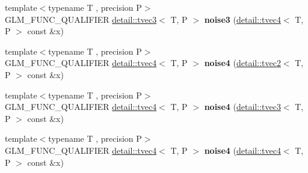 \begin{DoxyCompactItemize}
\item 
{\footnotesize template$<$typename T , precision P$>$ }\\G\+L\+M\+\_\+\+F\+U\+N\+C\+\_\+\+Q\+U\+A\+L\+I\+F\+I\+ER \hyperlink{structglm_1_1detail_1_1tvec3}{detail\+::tvec3}$<$ T, P $>$ {\bfseries noise3} (\hyperlink{structglm_1_1detail_1_1tvec4}{detail\+::tvec4}$<$ T, P $>$ const \&x)\hypertarget{namespaceglm_aefcd263a48e42f99258c9dc05c131fdb}{}\label{namespaceglm_aefcd263a48e42f99258c9dc05c131fdb}

\item 
{\footnotesize template$<$typename T , precision P$>$ }\\G\+L\+M\+\_\+\+F\+U\+N\+C\+\_\+\+Q\+U\+A\+L\+I\+F\+I\+ER \hyperlink{structglm_1_1detail_1_1tvec4}{detail\+::tvec4}$<$ T, P $>$ {\bfseries noise4} (\hyperlink{structglm_1_1detail_1_1tvec2}{detail\+::tvec2}$<$ T, P $>$ const \&x)\hypertarget{namespaceglm_aa64dcec1a8c06703a5c26218f1c83c63}{}\label{namespaceglm_aa64dcec1a8c06703a5c26218f1c83c63}

\item 
{\footnotesize template$<$typename T , precision P$>$ }\\G\+L\+M\+\_\+\+F\+U\+N\+C\+\_\+\+Q\+U\+A\+L\+I\+F\+I\+ER \hyperlink{structglm_1_1detail_1_1tvec4}{detail\+::tvec4}$<$ T, P $>$ {\bfseries noise4} (\hyperlink{structglm_1_1detail_1_1tvec3}{detail\+::tvec3}$<$ T, P $>$ const \&x)\hypertarget{namespaceglm_aabc399aa2343a49622ac52a25cc5f961}{}\label{namespaceglm_aabc399aa2343a49622ac52a25cc5f961}

\item 
{\footnotesize template$<$typename T , precision P$>$ }\\G\+L\+M\+\_\+\+F\+U\+N\+C\+\_\+\+Q\+U\+A\+L\+I\+F\+I\+ER \hyperlink{structglm_1_1detail_1_1tvec4}{detail\+::tvec4}$<$ T, P $>$ {\bfseries noise4} (\hyperlink{structglm_1_1detail_1_1tvec4}{detail\+::tvec4}$<$ T, P $>$ const \&x)\hypertarget{namespaceglm_ae69869ab78e3158bcd45cc8105d49fd1}{}\label{namespaceglm_ae69869ab78e3158bcd45cc8105d49fd1}


\end{DoxyCompactItemize}
